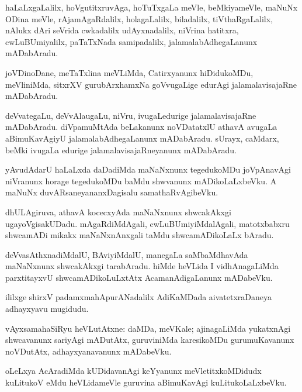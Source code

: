 \documentclass{article}
\begin{document}
\begin{mn}
haLaLxgaLalilx, hoVgutitxruvAga, hoTuTxgaLa meVle, beMkiyameVle, maNuNx ODina meVle, 
rAjamAgaRdalilx, holagaLalilx, biladalilx, tiVthaRgaLalilx, nAlukx dAri seVrida cwkadalilx 
udAyxnadalilx, niVrina hatitxra, cwLuBUmiyalilx, paTaTxNada samipadalilx, jalamalabAdhegaLanunx 
mADabAradu. 
\end{mn}

\begin{mn}
joVDinoDane, meTaTxlina meVLiMda, Catirxyanunx hiDidukoMDu, meVliniMda, sitxrXV gurubArxhamxNa 
goVvugaLige edurAgi jalamalavisajaRne mADabAradu.
\end{mn}

\begin{mn}
deVvategaLu, deVvAlaugaLu, niVru, ivugaLedurige jalamalavisajaRne mADabAradu. diVpamuMtAda 
beLakanunx noVDatatxlU athavA avugaLa aBimuKavAgiyU jalamalabAdhegaLanunx mADabAradu. sUrayx, 
caMdarx, beMki ivugaLa edurige jalamalavisajaRneyanunx mADabAradu.
\end{mn}

\begin{mn}
yAvudAdarU haLaLxda daDadiMda maNaNxnunx tegedukoMDu joVpAnavAgi niVranunx horage tegedukoMDu 
baMdu shwvanunx mADikoLaLxbeVku. A maNuNx duvARsaneyananxDagisalu samathaRvAgibeVku.
\end{mn}

\begin{mn}
dhULAgiruva, athavA kocecxyAda maNaNxnunx  shwcakAkxgi ugayoVgisakUDadu.  mAgaRdiMdAgali, 
cwLuBUmiyiMdalAgali, matotxbabxru shwcamADi mikakx maNaNxnAnxgali taMdu shwcamADikoLaLx bAradu.
\end{mn}

\begin{mn}
deVvasAthxnadiMdalU, BAviyiMdalU, manegaLa saMbaMdhavAda maNaNxnunx shwcakAkxgi tarabAradu. 
hiMde heVLida I vidhAnagaLiMda parxtitayxvU shwcamADikoLuLxtAtx AcamanAdigaLanunx mADabeVku.
\end{mn}

ililxge shirxV padamxmahApurANadalilx AdiKaMDada aivatetxraDaneya adhayxyavu mugidudu.

\begin{mn}
vAyxsamahaSiRyu heVLutAtxne: daMDa, meVKale; ajinagaLiMda yukatxnAgi shwcavanunx sariyAgi 
mADutAtx, guruviniMda karesikoMDu gurumuKavanunx noVDutAtx, adhayxyanavanunx mADabeVku.
\end{mn}

\begin{mn}
oLeLxya AcAradiMda kUDidavanAgi keYyanunx meVletitxkoMDidudx kuLitukoV eMdu heVLidameVle 
guruvina aBimuKavAgi kuLitukoLaLxbeVku.
\end{mn}
\end{document}
